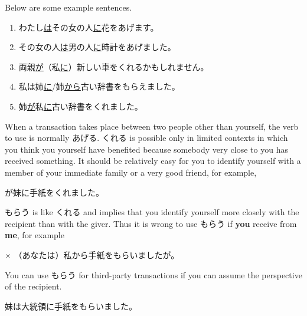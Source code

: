 \documentclass[notoc,notitlepage]{tufte-book}
\begin{document}
\begin{eg}
Below are some example sentences.
  \begin{enumerate}
    \item わたし\underline{は}その女の人\underline{に}花をあげます。
    \item その女の人\underline{は}男の人\underline{に}時計をあげました。
    \item 両親\underline{が}（私\underline{に}）新しい車をくれるかもしれません。
    \item 私は姉\underline{に}/姉\underline{から}古い辞書をもらえました。
    \item 姉\underline{が}私\underline{に}古い辞書をくれました。
  \end{enumerate}
\end{eg}

\begin{note}
  When a transaction takes place between two people other than yourself, the verb to use is normally あげる. くれる is possible only in limited contexts in which you think you yourself have benefited because somebody very close to you has received something. It should be relatively easy for you to identify yourself with a member of your immediate family or a very good friend, for example,
  \begin{center}
    が妹に手紙をくれました。
  \end{center}
\end{note}

\begin{note}
  もらう is like くれる and implies that you identify yourself more closely with the recipient than with the giver. Thus it is wrong to use もらう if \textbf{you} receive from \textbf{me}, for example 
  \begin{center}
    $\times$ （あなたは）私から手紙をもらいましたが。
  \end{center}
  You can use もらう for third-party transactions if you can assume the perspective of the recipient.
  \begin{center}
    妹は大統領に手紙をもらいました。
  \end{center}
\end{note}


\end{document}
